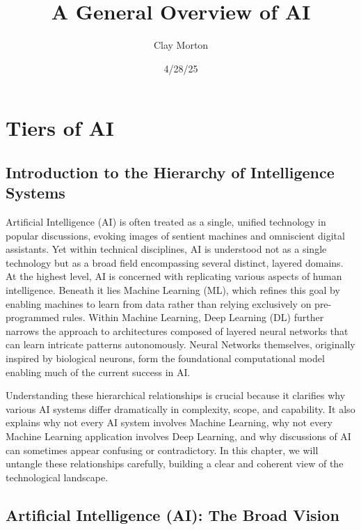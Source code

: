 \documentclass{book}
\title{A General Overview of AI}
\author{Clay Morton}
\date{4/28/25}
\begin{document}
\maketitle

\begingroup
\let\cleardoublepage\relax
\tableofcontents
\endgroup

\chapter{Tiers of AI}

\section{Introduction to the Hierarchy of Intelligence Systems}

Artificial Intelligence (AI) is often treated as a single, unified technology in
popular discussions, evoking images of sentient machines and omniscient digital 
assistants. Yet within technical disciplines, AI is understood not as a single 
technology but as a broad field encompassing several distinct, layered domains. 
At the highest level, AI is concerned with replicating various aspects of human 
intelligence. Beneath it lies Machine Learning (ML), which refines this goal by 
enabling machines to learn from data rather than relying exclusively on 
pre-programmed rules. Within Machine Learning, Deep Learning (DL) further 
narrows the approach to architectures composed of layered neural networks that 
can learn intricate patterns autonomously. Neural Networks themselves, 
originally inspired by biological neurons, form the foundational computational 
model enabling much of the current success in AI.

Understanding these hierarchical relationships is crucial because it clarifies 
why various AI systems differ dramatically in complexity, scope, and capability.
It also explains why not every AI system involves Machine Learning, why not 
every Machine Learning application involves Deep Learning, and why discussions 
of AI can sometimes appear confusing or contradictory. In this chapter, we will 
untangle these relationships carefully, building a clear and coherent view of 
the technological landscape.

\section{Artificial Intelligence (AI): The Broad Vision}
\end{document}
